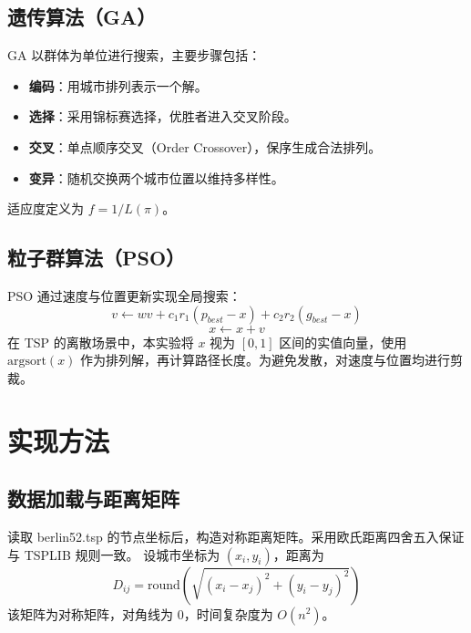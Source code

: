 \documentclass[runningheads]{ctexart}
\begin{document}
\subsection{遗传算法（GA）}
GA 以群体为单位进行搜索，主要步骤包括：
\begin{itemize}
	\item \textbf{编码}：用城市排列表示一个解。
	\item \textbf{选择}：采用锦标赛选择，优胜者进入交叉阶段。
	\item \textbf{交叉}：单点顺序交叉（Order Crossover），保序生成合法排列。
	\item \textbf{变异}：随机交换两个城市位置以维持多样性。
\end{itemize}
适应度定义为 $f=1/L(\pi)$。

\subsection{粒子群算法（PSO）}
PSO 通过速度与位置更新实现全局搜索：
\begin{equation}
	v \leftarrow w v + c_1 r_1 (p_{best}-x) + c_2 r_2 (g_{best}-x)
\end{equation}
\begin{equation}
	x \leftarrow x + v
\end{equation}
在 TSP 的离散场景中，本实验将 $x$ 视为 $[0,1]$ 区间的实值向量，使用 $\text{argsort}(x)$ 作为排列解，再计算路径长度。为避免发散，对速度与位置均进行剪裁。

\section{实现方法}
\subsection{数据加载与距离矩阵}
读取 berlin52.tsp 的节点坐标后，构造对称距离矩阵。采用欧氏距离四舍五入保证与 TSPLIB 规则一致。
设城市坐标为 $(x_i, y_i)$，距离为
\begin{equation}
	D_{ij} = \text{round}(\sqrt{(x_i-x_j)^2 + (y_i-y_j)^2})
\end{equation}
该矩阵为对称矩阵，对角线为 0，时间复杂度为 $O(n^2)$。
\end{document}
